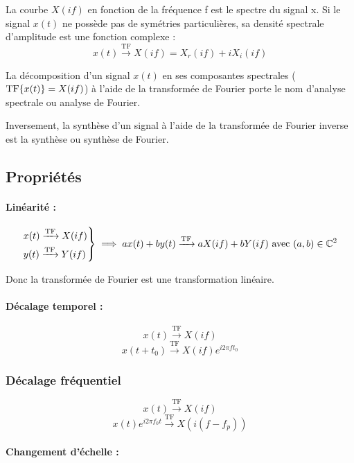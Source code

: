 \documentclass[a4paper,12pt]{report}
\begin{document}
La courbe $X(if)$ en fonction de la fréquence f est le spectre du signal x. Si le signal $x(t)$ ne possède pas de symétries particulières, sa densité spectrale d'amplitude est une fonction complexe :
\[ x(t) \xrightarrow{\mathrm{TF}} X(if) = X_r(if) + iX_i(if) \]

La décomposition d'un signal $x(t)$ en ses composantes spectrales ($\mathrm{TF} \{ x(t) \} = X(if)$) à l'aide de la transformée de Fourier porte le nom d'analyse spectrale ou analyse de Fourier.

Inversement, la synthèse d'un signal à l'aide de la transformée de Fourier inverse est la synthèse ou synthèse de Fourier.

\subsection{Propriétés}

\paragraph{Linéarité :}

\[
\begin{rcases}
    x(t) \xrightarrow{\mathrm{TF}} X(if) \\
    y(t) \xrightarrow{\mathrm{TF}} Y(if)
\end{rcases} \implies ax(t) + by(t) \xrightarrow{\mathrm{TF}} aX(if) + bY(if) \text{ avec } (a,b) \in \mathbb{C}^2\]

Donc la transformée de Fourier est une transformation linéaire.

\paragraph{Décalage temporel :}

\[ x(t) \xrightarrow{\mathrm{TF}} X(if) \]
\[ x(t + t_0) \xrightarrow{\mathrm{TF}} X(if) e^{i2\pi ft_0} \]

\subsubsection{Décalage fréquentiel}

\[ x(t) \xrightarrow{\mathrm{TF}} X(if) \]
\[ x(t) e^{i2\pi f_0t} \xrightarrow{\mathrm{TF}} X(i(f-f_p)) \]

\paragraph{Changement d'échelle :}
\end{document}
